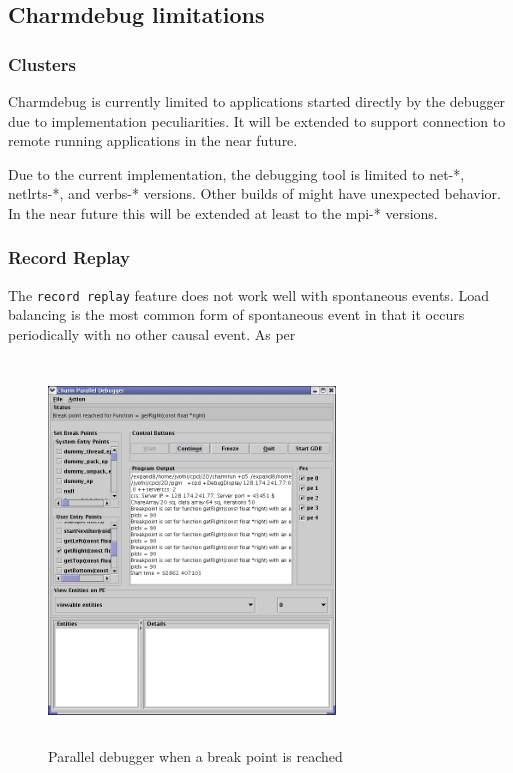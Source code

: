 \documentclass[10pt]{article}
\begin{document}
\subsection{Charmdebug limitations}

\subsubsection{Clusters}

Charmdebug is currently limited to applications started directly by the debugger
due to implementation peculiarities. It will be extended to support connection
to remote running applications in the near future. 

Due to the current implementation, the debugging tool is limited to net-*, netlrts-*, and verbs-*
versions. Other builds of \charmpp{} might have unexpected behavior. In the near
future this will be extended at least to the mpi-* versions.

\subsubsection{Record Replay}
The \texttt{record replay} feature does not work well with spontaneous
events.  Load balancing is the most common form of spontaneous event
in that it occurs periodically with no other causal event. As per

\begin{figure}[]
\includegraphics[scale=0.5,height=4in, width=3in]{figs/snapshot3}
\caption{Parallel debugger when a break point is reached}
\label{snapshot3}
\end{figure}
\end{document}
